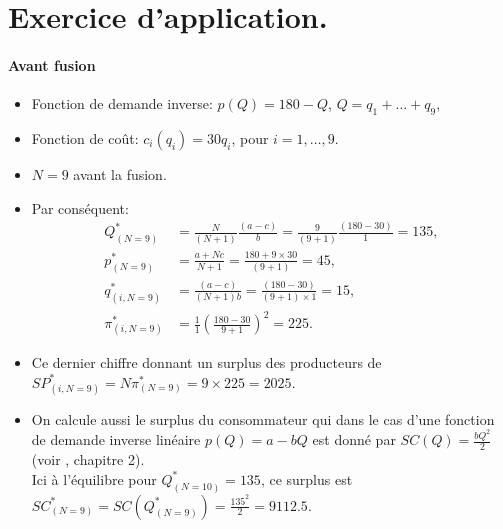 \documentclass[notes, ignorenonframetext, compress, 10pt, xcolor=svgnames, aspectratio=169]{beamer}
\begin{document}
\section{Exercice d’application.}
\frame{\sectionpage}
\begin{frame}[allowframebreaks]{\insertsection}
    \framesubtitle{Avant fusion}
    \begin{itemize}
        \item Fonction de demande inverse: $p(Q) = 180-Q$, $Q=q_1+ \ldots + q_{9}$, 
        \item Fonction de coût: $c_i(q_i) = 30q_i$, pour $i=1, \ldots, 9$.
        \item $N = 9$ avant la fusion.
        \item Par conséquent:
        \begin{align*}
        Q^*_{(N=9)} &= \frac{N}{(N+1)}\frac{(a-c)}{b} = \frac{9}{(9+1)}\frac{(180-30)}{1} = 135,\\
        p^*_{(N=9)} &= \frac{a+Nc}{N+1} = \frac{180+9\times 30}{(9+1)} = 45,\\
        q_{(i, N=9)}^*&=  \frac{(a-c)}{(N+1)b} = \frac{(180-30)}{(9+1)\times 1} =15   ,\\
        \pi_{(i, N=9)}^*&= \frac{1}{1}\left(\frac{180-30}{9+1}\right)^2 = 225.
        \end{align*}
        \item Ce dernier chiffre donnant un surplus des producteurs de $SP_{(i, N=9)}^* = N\pi_{(N=9)}^*=9\times 225 = 2025.$
        \item  On calcule aussi le surplus du consommateur qui dans le cas d'une fonction de demande inverse 
        linéaire $p(Q) = a-bQ$ est donné par $SC(Q) = \frac{bQ^2}{2}$(voir \citet{belleflamme_peitz_2015}, chapitre 2).\\ Ici à l'équilibre 
        pour $Q^*_{(N=10)} = 135$,
         ce surplus est $SC_{(N=9)}^* = SC(Q_{(N=9)}^*) = \frac{135^2}{2}  =9112.5$.
        \end{itemize}
\end{frame}
\end{document}

